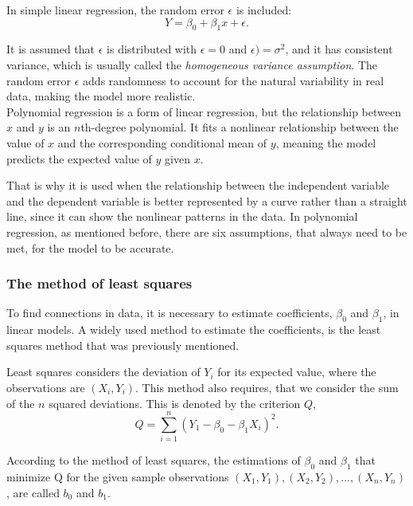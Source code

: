 \noindent In simple linear regression, the random error \( \epsilon \) is included:
\begin{equation}
Y = \beta_0 + \beta_1 x + \epsilon .
\end{equation}


\noindent It is assumed that \( \epsilon \) is distributed with $\epsilon = 0$ and $\epsilon) = \sigma^2$, and it has consistent variance, which is usually called the \textit{homogeneous variance assumption}. The random error \( \epsilon \) adds randomness to account for the natural variability in real data, making the model more realistic.
\newline\\
Polynomial regression is a form of linear regression, but the relationship between \( x \) and \( y \) is an \( n \)th-degree polynomial. It fits a nonlinear relationship between the value of \( x \) and the corresponding conditional mean of \( y \), meaning the model predicts the expected value of \( y \) given \( x \). \newline

\noindent That is why it is used when the relationship between the independent variable and the dependent variable is better represented by a curve rather than a straight line, since it can show the nonlinear patterns in the data.
In polynomial regression, as mentioned before, there are six assumptions, that always need to be met, for the model to be accurate.


\subsubsection{The method of least squares}

\noindent To find connections in data, it is necessary to estimate coefficients, $\beta_0$ and $\beta_1$, in linear models. 
A widely used method to estimate the coefficients, is the least squares method that was previously mentioned. 

\noindent Least squares considers the deviation of $Y_i$ for  its expected value, where the observations are $(X_i, Y_i)$. 
This method also requires, that we consider the sum of the $n$ squared deviations.
This is denoted by the criterion $Q$,
\begin{equation}
Q=\sum_{i=1}^{n}(Y_1-\beta_0 - \beta_1 X_i)^2 .
\end{equation}

\noindent According to the method of least squares, the estimations of $\beta_0$ and $\beta_1$ that minimize Q for the given sample observations $(X_1,Y_1), (X_2,Y_2), ..., (X_n,Y_n)$, are called $b_0$ and $b_1$.  

